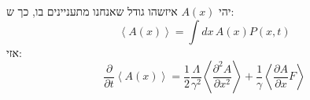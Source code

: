 \documentclass{tstextbook}
\begin{document}
\begin{proposition}
יהי \(A(x)\) איזשהו גודל שאנחנו מתעניינים בו, כך ש:
$$\left\langle A\left(x\right)\right\rangle=\int d x\,A\left(x\right)P\left(x,t\right)$$
אזי:
$$\frac{\partial}{\partial t}\left\langle A\left(x\right)\right\rangle=\frac{1}{2}\frac{\Lambda}{\gamma^{2}}\left\langle\frac{\partial^{2}A}{\partial x^{2}}\right\rangle+\frac{1}{\gamma}\left\langle\frac{\partial A}{\partial x}F\right\rangle$$

\end{proposition}
\end{document}
